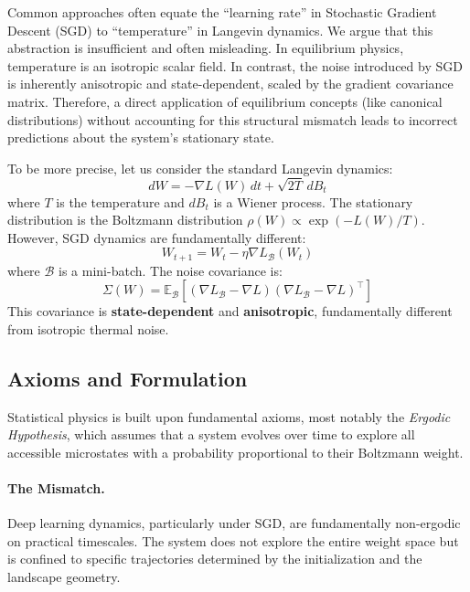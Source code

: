 \documentclass[
  journal=largetwo,
  year=2025,
  volume=37,
]{cup-journal}
\begin{document}
Common approaches often equate the ``learning rate'' in Stochastic Gradient Descent (SGD) to ``temperature'' in Langevin dynamics. We argue that this abstraction is insufficient and often misleading. In equilibrium physics, temperature is an isotropic scalar field. In contrast, the noise introduced by SGD is inherently anisotropic and state-dependent, scaled by the gradient covariance matrix. Therefore, a direct application of equilibrium concepts (like canonical distributions) without accounting for this structural mismatch leads to incorrect predictions about the system's stationary state.

To be more precise, let us consider the standard Langevin dynamics:
\begin{equation}
    dW = -\nabla L(W) \, dt + \sqrt{2T} \, dB_t
\end{equation}
where $T$ is the temperature and $dB_t$ is a Wiener process. The stationary distribution is the Boltzmann distribution $\rho(W) \propto \exp(-L(W)/T)$. However, SGD dynamics are fundamentally different:
\begin{equation}
    W_{t+1} = W_t - \eta \nabla L_{\mathcal{B}}(W_t)
\end{equation}
where $\mathcal{B}$ is a mini-batch. The noise covariance is:
\begin{equation}
    \Sigma(W) = \mathbb{E}_{\mathcal{B}}\left[(\nabla L_{\mathcal{B}} - \nabla L)(\nabla L_{\mathcal{B}} - \nabla L)^\top\right]
\end{equation}
This covariance is \textbf{state-dependent} and \textbf{anisotropic}, fundamentally different from isotropic thermal noise.

\subsection{Axioms and Formulation}

Statistical physics is built upon fundamental axioms, most notably the \textit{Ergodic Hypothesis}, which assumes that a system evolves over time to explore all accessible microstates with a probability proportional to their Boltzmann weight.

\paragraph{The Mismatch.} Deep learning dynamics, particularly under SGD, are fundamentally non-ergodic on practical timescales. The system does not explore the entire weight space but is confined to specific trajectories determined by the initialization and the landscape geometry.
\end{document}
